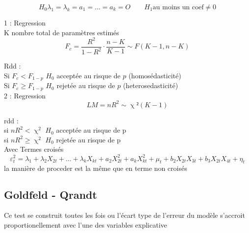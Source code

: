\documentclass{article}
\begin{document}
\begin{equation*}
    H_0 \lambda_1 = \lambda_k = a_1 = \ldots = a_k = O \qquad H_1 \text{au moins un coef} \neq
    0
\end{equation*}

1 : Regression \\
K nombre total de paramètres estimés
\begin{equation*}
    F_c = \frac{R^2}{1-R^2} \cdot \frac{n-K}{K-1} \sim F(K-1, n-K)
\end{equation*}

Rdd : \\
Si $F_c < F_{1-p} $ $H_0$ acceptée au risque de $p$ (homosédasticité) \\
Si $F_c \ge  F_{1-p} $ $H_0$ rejetée au risque de $p$ (heterosedasticité) \\

2 : Regression \\
\begin{equation*}
    LM = n R^2 \sim \upchi²(K-1)
\end{equation*}

rdd :\\
si $nR^2 < \upchi^2$ $H_0$ acceptée au risque de p \\
si $nR^2 \ge \upchi^2$ $H_0$ rejetée au risque de p \\

Avec Termes croisés 
\begin{equation}
    \varepsilon_{t}^2 = \lambda_1 + \lambda_2 X_{2t} + \ldots + \lambda_k X_{kt} + a_2 X_{2t}^2 +
    a_k X_{kt}^2+ \mu_t +b_2 X_{2t} X_{3t} + b_3 X_{2t} X_{4t}+\eta_t
\end{equation}
la manière de proceder est la même que en terme non croisés

\subsection{Goldfeld - Qrandt}
Ce test se construit toutes les fois ou l'écart type de l'erreur du modèle s'accroit
proportionellement avec l'une des variables explicative
\end{document}
